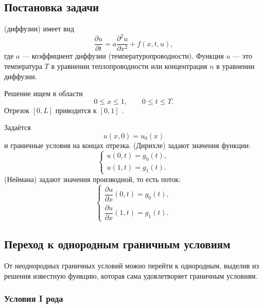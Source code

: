 \documentclass[../final.tex]{subfiles}
\begin{document}
\subsection{Постановка задачи}

 (диффузии) имеет вид
\begin{equation*}
    \frac{\partial u}{\partial t}
    =a\frac{\partial^2u}{\partial x^2}+f(x,t,u),
\end{equation*}
где $a$ --- коэффициент диффузии (температуропроводности).
Функция $u$ --- это температура $T$ в уравнении теплопроводности
или концентрация $n$ в уравнении диффузии.

Решение ищем в области
\begin{equation*}
    0\le x\le 1,\qquad 0\le t\le T.
\end{equation*}
Отрезок $[0,L]$ приводится к $[0,1]$ .

Задаётся 
\begin{equation*}
    u(x,0)=u_0(x)
\end{equation*}
и граничные условия на концах отрезка.
 (Дирихле) задают значения функции:
\begin{equation*}
    \begin{cases}
        u(0,t)=g_0(t),\\
        u(1,t)=g_1(t).
    \end{cases}
\end{equation*}
 (Неймана) задают значения
производной, то есть поток:
\begin{equation*}
    \begin{cases}
        \dfrac{\partial u}{\partial x}(0,t)=g_0(t),\\[0.8em]
        \dfrac{\partial u}{\partial x}(1,t)=g_1(t).
    \end{cases}
\end{equation*}

\subsection{Переход к однородным граничным условиям}

От неоднородных граничных условий можно перейти к однородным,
выделив из решения известную функцию, которая сама удовлетворяет
граничным условиям.

\subsubsection{Условия I рода}
\end{document}
